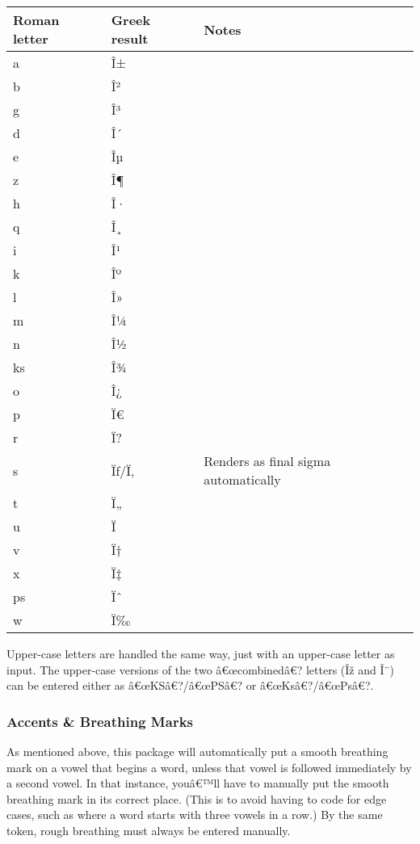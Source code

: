 \begin{longtable}[]{@{}lll@{}}
\toprule\noalign{}
Roman letter & Greek result & Notes \\
\midrule\noalign{}
\endhead
\bottomrule\noalign{}
\endlastfoot
a & Î± & \\
b & Î² & \\
g & Î³ & \\
d & Î´ & \\
e & Îµ & \\
z & Î¶ & \\
h & Î· & \\
q & Î¸ & \\
i & Î¹ & \\
k & Îº & \\
l & Î» & \\
m & Î¼ & \\
n & Î½ & \\
ks & Î¾ & \\
o & Î¿ & \\
p & Ï€ & \\
r & Ï? & \\
s & Ïƒ/Ï‚ & Renders as final sigma automatically \\
t & Ï„ & \\
u & Ï & \\
v & Ï† & \\
x & Ï‡ & \\
ps & Ïˆ & \\
w & Ï‰ & \\
\end{longtable}

Upper-case letters are handled the same way, just with an upper-case
letter as input. The upper-case versions of the two â€œcombinedâ€?
letters (Îž and Î¨) can be entered either as â€œKSâ€?/â€œPSâ€? or
â€œKsâ€?/â€œPsâ€?.

\subsubsection{Accents \& Breathing
Marks}\label{accents-breathing-marks}

As mentioned above, this package will automatically put a smooth
breathing mark on a vowel that begins a word, unless that vowel is
followed immediately by a second vowel. In that instance, youâ€™ll have
to manually put the smooth breathing mark in its correct place. (This is
to avoid having to code for edge cases, such as where a word starts with
three vowels in a row.) By the same token, rough breathing must always
be entered manually.

